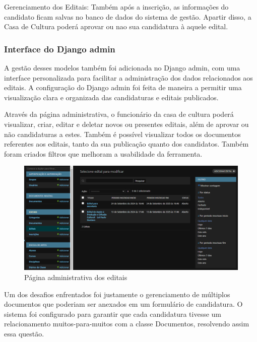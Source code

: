 Gerenciamento dos Editais: Também após a inscrição, as informações do candidato ficam salvas no banco de dados do sistema de gestão. Apartir disso, a Casa de Cultura poderá aprovar ou nao sua candidatura à aquele edital.

\subsubsection{Interface do Django admin}

A gestão desses modelos também foi adicionada no Django admin, com uma interface personalizada para facilitar a administração dos dados relacionados aos editais. A configuração do Django admin foi feita de maneira a permitir uma visualização clara e organizada das candidaturas e editais publicados.

Através da página administrativa, o funcionário da casa de cultura poderá visualizar, criar, editar e deletar novos ou presentes editais, além de aprovar ou não candidaturas a estes. Também é possível visualizar todos os documentos referentes aos editais, tanto da sua publicação quanto dos candidatos. Também foram criados filtros que melhoram a usabilidade da ferramenta.

\begin{figure}[htb]
	\caption{\label{fig_grafico}Página administrativa dos editais}
	\begin{center}
	    \includegraphics[scale=0.35]{./img/admin_edital.png}
	\end{center}
\end{figure}


Um dos desafios enfrentados foi justamente o gerenciamento de múltiplos documentos que poderiam ser anexados em um formulário de candidatura. O sistema foi configurado para garantir que cada candidatura tivesse um relacionamento muitos-para-muitos com a classe Documentos, resolvendo assim essa questão.

